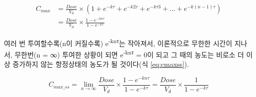 \documentclass[
  11pt,
  krantz2, a4paper, twoside]{krantz}
\theoremstyle{definition}
\theoremstyle{definition}
\theoremstyle{definition}
\theoremstyle{definition}
\theoremstyle{remark}
\begin{document}
\begin{equation}
\begin{split}
  C_{max} &= \frac{Dose}{V_{d}} \times \left( 1 + e^{- k\tau} + e^{- k2\tau} + e^{- k\tau 3} + \ldots + e^{- k\left( n - 1 \right)\tau} \right)  \\
  &= \frac{Dose}{V_{d}} \times \frac{1 - e^{- kn\tau}}{1 - e^{- k\tau}}
\end{split}
\label{eq:cmax}
\end{equation}

여러 번 투여할수록(n이 커질수록) e\textsuperscript{-knτ}는 작아져서, 이론적으로 무한한 시간이 지나서, 무한번(n = ∞) 투여한 상황이 되면 e\textsuperscript{-knτ} = 0이 되고 그 때의 농도는 비로소 더 이상 증가하지 않는 항정상태의 농도가 될 것이다(식 \eqref{eq:cmaxss}).

\begin{equation}
{C_{max\_ ss} = \lim_{n \rightarrow \infty}}{\frac{{Dose}}{V_{d}} \times \frac{1 - e^{- kn\tau}}{1 - e^{- k\tau}} = \frac{{Dose}}{V_{d}} \times \frac{1}{1 - e^{- k\tau}}}
\label{eq:cmaxss}
\end{equation}
\end{document}
